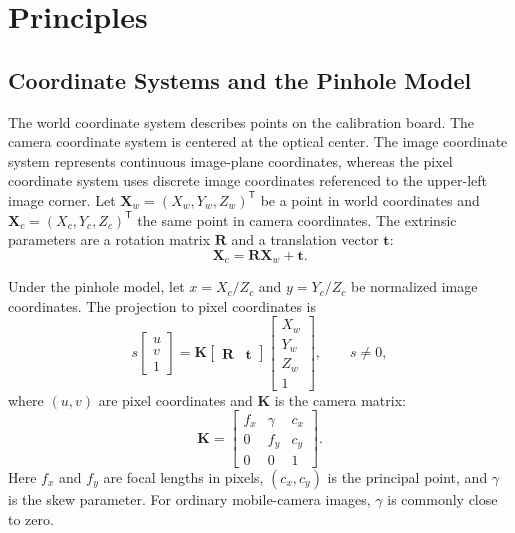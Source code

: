 \section{Principles}\label{sec:task2-principle}

\subsection{Coordinate Systems and the Pinhole Model}\label{sec:task2-coordinate-system}

The world coordinate system describes points on the calibration board. The camera coordinate system is centered at the optical center. The image coordinate system represents continuous image-plane coordinates, whereas the pixel coordinate system uses discrete image coordinates referenced to the upper-left image corner. Let
\(\mathbf{X}_{w}=(X_{w},Y_{w},Z_{w})^{\mathsf T}\) be a point in world coordinates and
\(\mathbf{X}_{c}=(X_{c},Y_{c},Z_{c})^{\mathsf T}\) the same point in camera coordinates. The extrinsic parameters are a rotation matrix \(\mathbf{R}\) and a translation vector \(\mathbf{t}\):
\begin{equation}
\mathbf{X}_{c}=\mathbf{R}\mathbf{X}_{w}+\mathbf{t}.
\label{eq:task2-extrinsic}
\end{equation}

Under the pinhole model, let \(x=X_{c}/Z_{c}\) and \(y=Y_{c}/Z_{c}\) be normalized image coordinates. The projection to pixel coordinates is
\begin{equation}
s
\begin{bmatrix}
u\\v\\1
\end{bmatrix}
=
\mathbf{K}
\begin{bmatrix}
\mathbf{R}&\mathbf{t}
\end{bmatrix}
\begin{bmatrix}
X_{w}\\Y_{w}\\Z_{w}\\1
\end{bmatrix},
\qquad s\ne0,
\label{eq:task2-projection}
\end{equation}
where \((u,v)\) are pixel coordinates and \(\mathbf{K}\) is the camera matrix:
\begin{equation}
\mathbf{K}=
\begin{bmatrix}
f_{x}&\gamma&c_{x}\\
0&f_{y}&c_{y}\\
0&0&1
\end{bmatrix}.
\label{eq:task2-intrinsic}
\end{equation}
Here \(f_x\) and \(f_y\) are focal lengths in pixels, \((c_x,c_y)\) is the principal point, and \(\gamma\) is the skew parameter. For ordinary mobile-camera images, \(\gamma\) is commonly close to zero.

